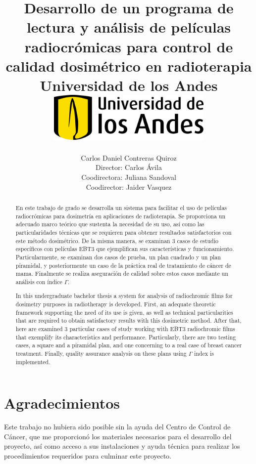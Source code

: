 \documentclass[12pt]{report}
\title 
{
	{Desarrollo de un programa de lectura y análisis de películas radiocrómicas para control de calidad dosimétrico en radioterapia}\\
	{\large Universidad de los Andes}\\
	\vspace{1.5cm}
	{\includegraphics[width = 0.6\textwidth]{logo.png}}	
}
\author{Carlos Daniel Contreras Quiroz\\[1cm]{\small Director: Carlos \'Avila}\\[1cm]{\small Coodirectora: Juliana Sandoval}\\[1cm]{\small Coodirector: Jaider Vasquez}}
\newenvironment{dedication}
  {\clearpage           %
   \thispagestyle{empty}%
   \vspace*{\stretch{1}}%
   \raggedleft          %
  }
  {\par %
   \vspace{\stretch{3}} %
   \clearpage           %
  }
\theoremstyle{definition}
\begin{document}

\maketitle


\begin{abstract}

En este trabajo de grado se desarrolla un sistema para facilitar el uso de películas radiocrómicas para dosimetría en aplicaciones de radioterapia. Se proporciona un adecuado marco teórico que sustenta la necesidad de su uso, así como las particularidades técnicas que se requieren para obtener resultados satisfactorios con este método dosimétrico. De la misma manera, se examinan 3 casos de estudio específicos con películas EBT3 que ejemplifican sus características y funcionamiento. Particularmente, se examinan dos casos de prueba, un plan cuadrado y un plan piramidal, y posteriormente un caso de la práctica real de tratamiento de cáncer de mama. Finalmente se realiza aseguración de calidad sobre estos casos mediante un análisis con índice $\Gamma$.   

\end{abstract}

\begin{otherlanguage}{english}
	
\begin{abstract}
In this undergraduate bachelor thesis a system for analysis of radiochromic films for dosimetry purposes in radiotherapy is developed. First, an adequate theoretic framework supporting the need of its use is given, as well as technical particularities that are required to obtain satisfactory results with this dosimetric method. After that, here are examined 3 particular cases of study working with EBT3 radiochromic films that exemplify its characteristics and performance. Particularly, there are two testing cases, a square and a piramidal plan, and one concerning to a real case of  breast cancer treatment. Finally, quality assurance analysis on these plans using $\Gamma$ index is implemented. 

\end{abstract}
\end{otherlanguage}

\newpage

\chapter*{Agradecimientos}
Este trabajo no hubiera sido posible sin la ayuda del Centro de Control de Cáncer, que me proporcionó los materiales necesarios para el desarrollo del proyecto, así como acceso a sus instalaciones y ayuda técnica para realizar los procedimientos requeridos para culminar este proyecto.\\
\end{document}
